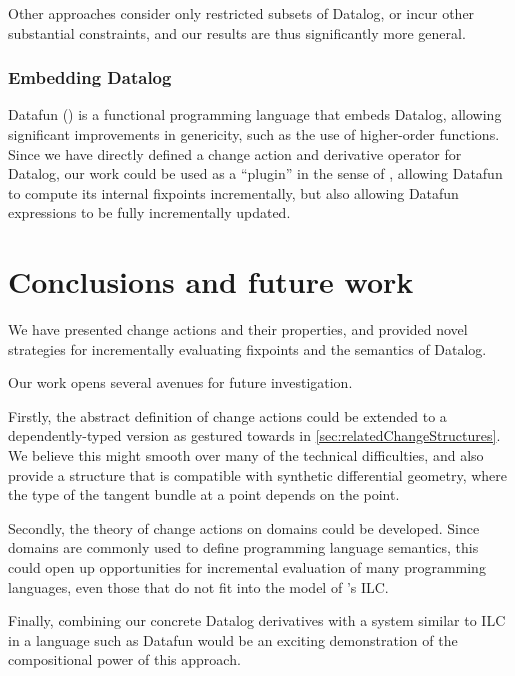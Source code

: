 Other approaches \autocites{dong2000incremental}{urpi1992method} consider only
restricted subsets of Datalog, or incur other substantial constraints, and our results
are thus significantly more general.

\subsubsection{Embedding Datalog}
\label{sec:embeddingDatalog}

Datafun (\textcite{arntz2016datafun}) is a functional programming language that embeds
Datalog, allowing significant improvements in genericity, such as the use of
higher-order functions. Since we have directly defined a change action and
derivative operator for Datalog, our work could be used as a ``plugin'' in the sense
of \citeauthor{cai2014changes}, allowing Datafun to compute its internal fixpoints
incrementally, but also allowing Datafun expressions to be fully incrementally updated.

\section{Conclusions and future work}

We have presented change actions and their properties, and provided novel
strategies for incrementally evaluating fixpoints and the semantics of Datalog.

Our work opens several avenues for future investigation.

Firstly, the abstract definition of change actions could be extended to a
dependently-typed version as gestured towards in
\cref{sec:relatedChangeStructures}. We believe this might smooth over many of
the technical difficulties, and also provide a structure that is compatible with
synthetic differential geometry, where the type of the tangent bundle at a point
depends on the point.

Secondly, the theory of change actions on domains could be developed. Since
domains are commonly used to define programming language semantics, this could
open up opportunities for incremental evaluation of many programming languages,
even those that do not fit into the model of \citeauthor{cai2014changes}'s ILC.

Finally, combining our concrete Datalog derivatives with a system similar to ILC
in a language such as Datafun would be an exciting demonstration of the compositional
power of this approach.

\printbibliography


